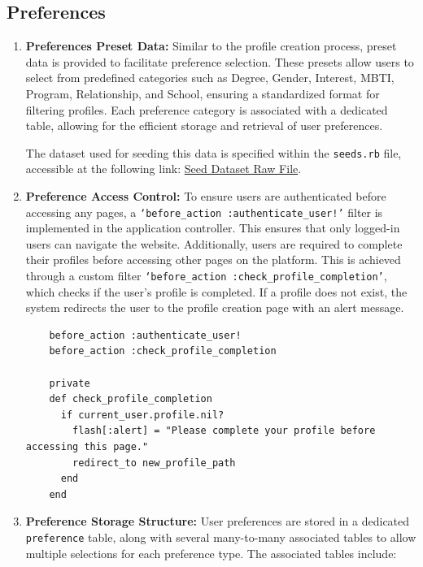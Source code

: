 \subsection{Preferences}\bigskip

\begin{enumerate}
    \item \textbf{Preferences Preset Data:} 
    Similar to the profile creation process, preset data is provided to facilitate preference selection. These presets allow users to select from predefined categories such as Degree, Gender, Interest, MBTI, Program, Relationship, and School, ensuring a standardized format for filtering profiles. Each preference category is associated with a dedicated table, allowing for the efficient storage and retrieval of user preferences.

    \bigskip
    The dataset used for seeding this data is specified within the \texttt{seeds.rb} file, accessible at the following link:
    \href{https://raw.githubusercontent.com/werrnnnwerrrnnnnnn/AIT-Match/29f98b79013186116728a6cc8f13855453c216bd/app/db/seeds.rb}{Seed Dataset Raw File}.

    \item \textbf{Preference Access Control:} 
    To ensure users are authenticated before accessing any pages, a \texttt{`before\_action :authenticate\_user!'} filter is implemented in the application controller. This ensures that only logged-in users can navigate the website. Additionally, users are required to complete their profiles before accessing other pages on the platform. This is achieved through a custom filter \texttt{`before\_action :check\_profile\_completion'}, which checks if the user’s profile is completed. If a profile does not exist, the system redirects the user to the profile creation page with an alert message.
    \begin{lstlisting}
    before_action :authenticate_user!
    before_action :check_profile_completion
    
    private
    def check_profile_completion
      if current_user.profile.nil?
        flash[:alert] = "Please complete your profile before accessing this page."
        redirect_to new_profile_path
      end
    end
    \end{lstlisting}

    \newpage
    \item \textbf{Preference Storage Structure:} 
    User preferences are stored in a dedicated \texttt{preference} table, along with several many-to-many associated tables to allow multiple selections for each preference type. The associated tables include:
    

\end{enumerate}
